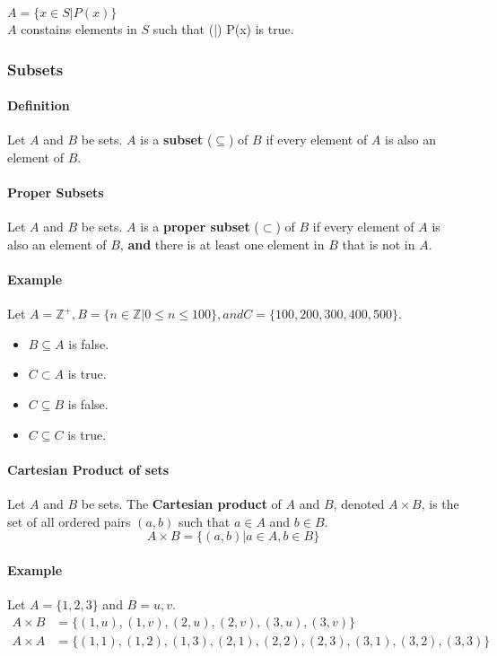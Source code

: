 \begin{center}
    $A = \{x\in S | P(x)\}$\\
    $A$ constains elements in $S$ such that (|) P(x) is true.
\end{center}

\pagebreak

\subsubsection*{Subsets}
\paragraph*{Definition}
Let $A$ and $B$ be sets. $A$ is a \textbf{subset} ($\subseteq$) of $B$ if every element of $A$ is also an element of $B$.\\

\paragraph*{Proper Subsets}
Let $A$ and $B$ be sets. $A$ is a \textbf{proper subset} ($\subset$) of $B$ if every element of $A$ is also an element of $B$, \textbf{and} 
there is at least one element in $B$ that is not in $A$.\\

\paragraph*{Example}
Let $A = \mathbb{Z^+}, B = \{n\in\mathbb{Z}|0\leq n\leq 100\}, and C = \{100,200,300,400,500\}$.
\begin{itemize}
    \item $B \subseteq A$ is false.
    \item $C \subset A$ is true.
    \item $C \subseteq B$ is false.
    \item $C \subseteq C$ is true.
\end{itemize}

\paragraph*{Cartesian Product of sets}
Let $A$ and $B$ be sets. The \textbf{Cartesian product} of $A$ and $B$, denoted $A\times B$, is the set of all ordered pairs $(a,b)$ such that $a\in A$ and $b\in B$.\\
\begin{equation*}
    A\times B = \{(a,b)|a\in A, b\in B\}
\end{equation*} 

\paragraph*{Example}
Let $A = \{1,2,3\}$ and $B = {u,v}$.
\begin{align*}
    A\times B &= \{(1,u),(1,v),(2,u),(2,v),(3,u),(3,v)\}\\
    A\times A &= \{(1,1),(1,2),(1,3),(2,1),(2,2),(2,3),(3,1),(3,2),(3,3)\}
\end{align*}